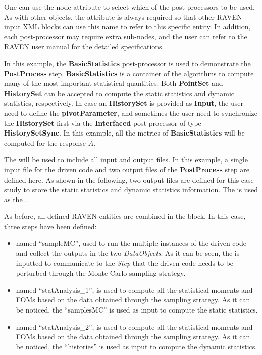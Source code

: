 One can use the node attribute  to select which of the post-processors to be used. As with other
objects, the attribute  is always required so that other RAVEN input XML blocks can use this name
to refer to this specific entity. In addition, each post-processor may require extra sub-nodes, and the user can refer
to the RAVEN user manual for the detailed specifications.

In this example, the \textbf{BasicStatistics} post-processor is used to demonstrate the \textbf{PostProcess} step.
\textbf{BasicStatistics} is a container of the algorithms to compute many of the most important statistical quantities.
Both \textbf{PointSet} and \textbf{HistorySet} can be accepted to compute the static statistics and dynamic statistics,
respectively. In case an \textbf{HistorySet} is provided as \textbf{Input}, the user need to define the \textbf{pivotParameter},
and sometimes the user need to synchronize the \textbf{HistorySet} first via the \textbf{Interfaced} post-processor of
type \textbf{HistorySetSync}.
In this example, all the metrics of \textbf{BasicStatistics} will be computed for the response $A$.

The  will be used to include all input and output files. In this example, a single input file
for the driven code and two output files of the \textbf{PostProcess} step are defined here. As shown in the following,
two output files are defined for this case study to store the static statistics and dynamic statistics information.
The  is used as the .


As before, all defined RAVEN entities are combined in the  block.
In this case, three steps have been defined:

\begin{itemize}
  \item {} named ``sampleMC'', used to run the multiple instances of the driven code and
     collect the outputs in the two \textit{DataObjects}. As it can be seen, the  is inputted
     to communicate to the \textit{Step} that the driven code needs to be perturbed through the Monte Carlo sampling
     strategy.
  \item {} named ``statAnalysis\_1'', is used to compute all the statistical moments and FOMs 
    based on the data obtained through the sampling strategy. As it can be noticed, the 
    ``samplesMC'' is used as input to compute the static statistics.
  \item {} named ``statAnalysis\_2'', is used to compute all the statistical moments and FOMs
    based on the data obtained through the sampling strategy. As it can be noticed, the 
    ``histories'' is used as input to compute the dynamic statistics.
\end{itemize}

